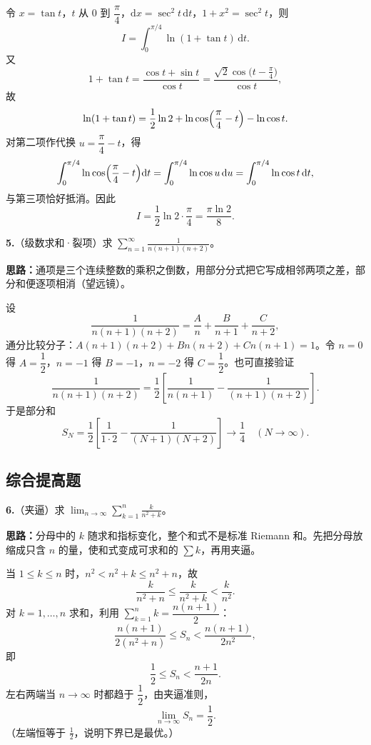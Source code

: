 令 $x=\tan t$，$t$ 从 $0$ 到 $\dfrac{\pi}{4}$，$\mathrm{d}x=\sec^{2}t\,\mathrm{d}t$，$1+x^{2}=\sec^{2}t$，则
\[
I=\int_{0}^{\pi/4}\ln(1+\tan t)\,\mathrm{d}t.
\]
又
\[
1+\tan t=\frac{\cos t+\sin t}{\cos t}
=\frac{\sqrt{2}\cos\bigl(t-\frac{\pi}{4}\bigr)}{\cos t},
\]
故
\[
\ln(1+\tan t)=\frac{1}{2}\ln2+\ln\cos\Bigl(\frac{\pi}{4}-t\Bigr)-\ln\cos t.
\]
对第二项作代换 $u=\dfrac{\pi}{4}-t$，得
\[
\int_{0}^{\pi/4}\ln\cos\Bigl(\frac{\pi}{4}-t\Bigr)\mathrm{d}t
=\int_{0}^{\pi/4}\ln\cos u\,\mathrm{d}u
=\int_{0}^{\pi/4}\ln\cos t\,\mathrm{d}t,
\]
与第三项恰好抵消。因此
\[
I=\frac{1}{2}\ln2\cdot\frac{\pi}{4}=\frac{\pi\ln2}{8}.
\]


\else \answerarea[8] \fi%
\textbf{5.}（级数求和·裂项）求 $\displaystyle\sum_{n=1}^{\infty}\frac{1}{n(n+1)(n+2)}$。

\ifshowsolutions%
\textbf{思路：}通项是三个连续整数的乘积之倒数，用部分分式把它写成相邻两项之差，部分和便逐项相消（望远镜）。

设
\[
\frac{1}{n(n+1)(n+2)}=\frac{A}{n}+\frac{B}{n+1}+\frac{C}{n+2},
\]
通分比较分子：$A(n+1)(n+2)+Bn(n+2)+Cn(n+1)=1$。令 $n=0$ 得 $A=\dfrac{1}{2}$，$n=-1$ 得 $B=-1$，$n=-2$ 得 $C=\dfrac{1}{2}$。也可直接验证
\[
\frac{1}{n(n+1)(n+2)}
=\frac{1}{2}\left[\frac{1}{n(n+1)}-\frac{1}{(n+1)(n+2)}\right].
\]
于是部分和
\[
S_{N}=\frac{1}{2}\left[\frac{1}{1\cdot2}-\frac{1}{(N+1)(N+2)}\right]
\longrightarrow \frac{1}{4}\quad(N\to\infty).
\]


\else \answerarea[8] \fi%
\subsection{综合提高题}

\textbf{6.}（夹逼）求 $\displaystyle\lim_{n\to\infty}\sum_{k=1}^{n}\frac{k}{n^{2}+k}$。

\ifshowsolutions%
\textbf{思路：}分母中的 $k$ 随求和指标变化，整个和式不是标准 Riemann 和。先把分母放缩成只含 $n$ 的量，使和式变成可求和的 $\sum k$，再用夹逼。

当 $1\le k\le n$ 时，$n^{2}<n^{2}+k\le n^{2}+n$，故
\[
\frac{k}{n^{2}+n}\le\frac{k}{n^{2}+k}<\frac{k}{n^{2}}.
\]
对 $k=1,\dots,n$ 求和，利用 $\sum\limits_{k=1}^{n}k=\dfrac{n(n+1)}{2}$：
\[
\frac{n(n+1)}{2(n^{2}+n)}\le S_{n}<\frac{n(n+1)}{2n^{2}},
\]
即
\[
\frac{1}{2}\le S_{n}<\frac{n+1}{2n}.
\]
左右两端当 $n\to\infty$ 时都趋于 $\dfrac{1}{2}$，由夹逼准则，
\[
\lim_{n\to\infty}S_{n}=\frac{1}{2}.
\]
（左端恒等于 $\frac12$，说明下界已是最优。）

